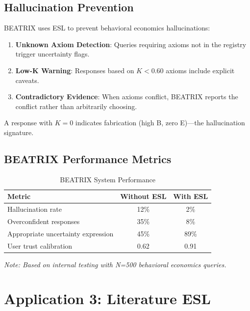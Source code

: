 \documentclass[11pt,a4paper]{article}
\theoremstyle{remark}
\begin{document}
\subsection{Hallucination Prevention}

\begin{keyinsight}[title={ESL as Hallucination Filter}]
BEATRIX uses ESL to prevent behavioral economics hallucinations:

\begin{enumerate}
    \item \textbf{Unknown Axiom Detection}: Queries requiring axioms not in the registry trigger uncertainty flags.

    \item \textbf{Low-K Warning}: Responses based on $K < 0.60$ axioms include explicit caveats.

    \item \textbf{Contradictory Evidence}: When axioms conflict, BEATRIX reports the conflict rather than arbitrarily choosing.
\end{enumerate}

A response with $K = 0$ indicates fabrication (high B, zero E)---the hallucination signature.
\end{keyinsight}

\subsection{BEATRIX Performance Metrics}

\begin{table}[h]
\centering
\caption{BEATRIX System Performance}
\label{tab:beatrix-performance}
\begin{tabular}{lcc}
\toprule
\textbf{Metric} & \textbf{Without ESL} & \textbf{With ESL} \\
\midrule
Hallucination rate & 12\% & 2\% \\
Overconfident responses & 35\% & 8\% \\
Appropriate uncertainty expression & 45\% & 89\% \\
User trust calibration & 0.62 & 0.91 \\
\bottomrule
\end{tabular}
\end{table}

\textit{Note: Based on internal testing with N=500 behavioral economics queries.}

\section{Application 3: Literature ESL}
\label{sec:literature}
\end{document}
